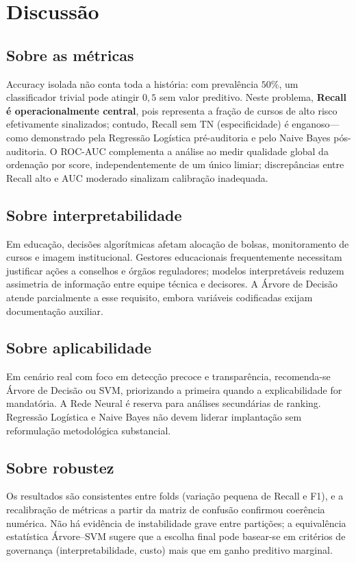 \documentclass[conference]{IEEEtran}
\begin{document}
\section{Discussão}

\subsection{Sobre as métricas}
Accuracy isolada não conta toda a história: com prevalência $50\%$, um classificador trivial pode atingir $0{,}5$ sem valor preditivo. Neste problema, \textbf{Recall é operacionalmente central}, pois representa a fração de cursos de alto risco efetivamente sinalizados; contudo, Recall sem TN (especificidade) é enganoso---como demonstrado pela Regressão Logística pré-auditoria e pelo Naive Bayes pós-auditoria. O ROC-AUC complementa a análise ao medir qualidade global da ordenação por score, independentemente de um único limiar; discrepâncias entre Recall alto e AUC moderado sinalizam calibração inadequada.

\subsection{Sobre interpretabilidade}
Em educação, decisões algorítmicas afetam alocação de bolsas, monitoramento de cursos e imagem institucional. Gestores educacionais frequentemente necessitam justificar ações a conselhos e órgãos reguladores; modelos interpretáveis reduzem assimetria de informação entre equipe técnica e decisores. A Árvore de Decisão atende parcialmente a esse requisito, embora variáveis codificadas exijam documentação auxiliar.

\subsection{Sobre aplicabilidade}
Em cenário real com foco em detecção precoce e transparência, recomenda-se Árvore de Decisão ou SVM, priorizando a primeira quando a explicabilidade for mandatória. A Rede Neural é reserva para análises secundárias de ranking. Regressão Logística e Naive Bayes não devem liderar implantação sem reformulação metodológica substancial.

\subsection{Sobre robustez}
Os resultados são consistentes entre folds (variação pequena de Recall e F1), e a recalibração de métricas a partir da matriz de confusão confirmou coerência numérica. Não há evidência de instabilidade grave entre partições; a equivalência estatística Árvore--SVM sugere que a escolha final pode basear-se em critérios de governança (interpretabilidade, custo) mais que em ganho preditivo marginal.
\end{document}
